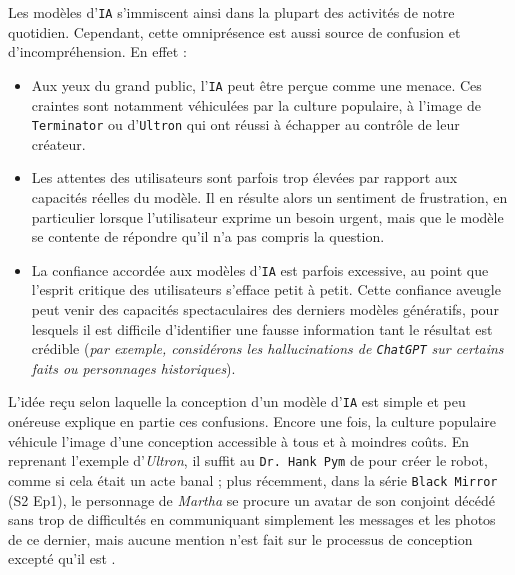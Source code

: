 		Les modèles d'\texttt{IA} s'immiscent ainsi dans la plupart des activités de notre quotidien.
		Cependant, cette omniprésence est aussi source de confusion et d'incompréhension.
		En effet :
		\begin{itemize}
			\item Aux yeux du grand public, l'\texttt{IA} peut être perçue comme une menace.
			Ces craintes sont notamment véhiculées par la culture populaire, à l'image de \texttt{Terminator} ou d'\texttt{Ultron} qui ont réussi à échapper au contrôle de leur créateur.
			\item Les attentes des utilisateurs sont parfois trop élevées par rapport aux capacités réelles du modèle.
			Il en résulte alors un sentiment de frustration, en particulier lorsque l'utilisateur exprime un besoin urgent, mais que le modèle se contente de répondre qu'il n'a pas compris la question.
			\item La confiance accordée aux modèles d'\texttt{IA} est parfois excessive, au point que l'esprit critique des utilisateurs s'efface petit à petit.
			Cette confiance aveugle peut venir des capacités spectaculaires des derniers modèles génératifs, pour lesquels il est difficile d'identifier une fausse information tant le résultat est crédible (\textit{par exemple, considérons les hallucinations de \texttt{ChatGPT} sur certains faits ou personnages historiques}). 
		\end{itemize}
		
		L'idée reçu selon laquelle la conception d'un modèle d'\texttt{IA} est simple et peu onéreuse explique en partie ces confusions.
		Encore une fois, la culture populaire véhicule l'image d'une conception accessible à tous et à moindres coûts.
		En reprenant l'exemple d'\textit{Ultron}, il suffit au \texttt{Dr. Hank Pym} de  pour créer le robot, comme si cela était un acte banal ; plus récemment, dans la série \texttt{Black Mirror} (S2 Ep1), le personnage de \textit{Martha} se procure un avatar de son conjoint décédé sans trop de difficultés en communiquant simplement les messages et les photos de ce dernier, mais aucune mention n'est fait sur le processus de conception excepté qu'il est .
		
		
